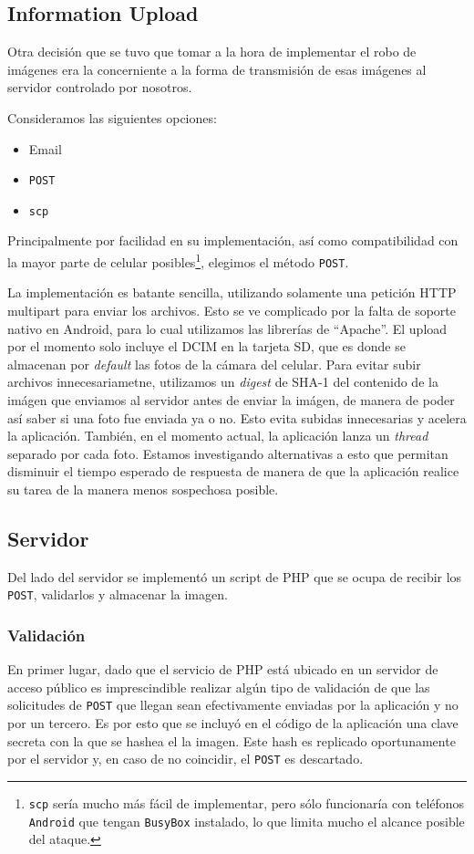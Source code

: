 \documentclass[10pt, a4paper,english,spanish]{article}
\begin{document}
\subsection{Information Upload} %
\label{sub:Information Upload}
Otra decisión que se tuvo que tomar a la hora de implementar el robo de imágenes era la concerniente a la forma de transmisión de esas imágenes al servidor controlado por nosotros. 

Consideramos las siguientes opciones:
\begin{itemize}
	\item Email
	\item \texttt{POST}
	\item \texttt{scp}
\end{itemize}


Principalmente por facilidad en su implementación, así como compatibilidad con la mayor parte de celular posibles\footnote{\texttt{scp} sería mucho más fácil de implementar, pero sólo funcionaría con teléfonos \texttt{Android} que tengan \texttt{BusyBox} instalado, lo que limita mucho el alcance posible del ataque.}, elegimos el método \texttt{POST}.

La implementación es batante sencilla, utilizando solamente una petición HTTP multipart para enviar los archivos. Esto se ve complicado por la falta de soporte nativo en Android, para lo cual utilizamos las librerías de ``Apache''. El upload por el momento solo incluye el DCIM en la tarjeta SD, que es donde se almacenan por \textit{default} las fotos de la cámara del celular. Para evitar subir archivos innecesariametne, utilizamos un \textit{digest} de SHA-1 del contenido de la imágen que enviamos al servidor antes de enviar la imágen, de manera de poder así saber si una foto fue enviada ya o no. Esto evita subidas innecesarias y acelera la aplicación. También, en el momento actual, la aplicación lanza un \textit{thread} separado por cada foto. Estamos investigando alternativas a esto que permitan disminuir el tiempo esperado de respuesta de manera de que la aplicación realice su tarea de la manera menos sospechosa posible.

\subsection{Servidor} %
\label{sub:Servidor}
Del lado del servidor se implementó un script de PHP que se ocupa de recibir los \texttt{POST}, validarlos y almacenar la imagen.

\subsubsection{Validación} %
En primer lugar, dado que el servicio de PHP está ubicado en un servidor de acceso público es imprescindible realizar algún tipo de validación de que las solicitudes de \texttt{POST} que llegan sean efectivamente enviadas por la aplicación y no por un tercero. Es por esto que se incluyó en el código de la aplicación una clave secreta con la que se hashea el la imagen. Este hash es replicado oportunamente por el servidor y, en caso de no coincidir, el \texttt{POST} es descartado.
\label{subsub:Validación}
\end{document}
